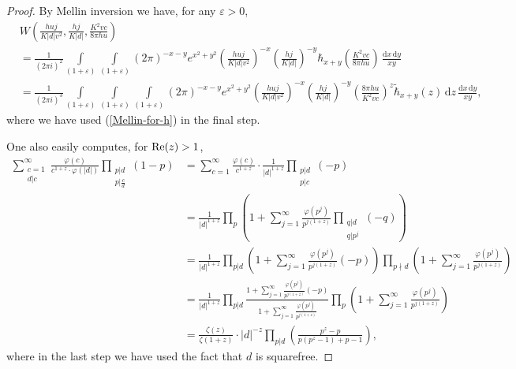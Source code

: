 \documentclass[a4paper,10pt,twoside]{amsart}
\theoremstyle{definition}
\numberwithin{equation}{section}
\newcommand\eps{\varepsilon}
\renewcommand{\Re}{\textnormal{Re}}
\renewcommand\:{\colon}
\begin{document}
\begin{proof}
By Mellin inversion we have, for any $\eps>0$,
\begin{align*}
&W\left(\frac{huj}{K|d|v^2},\frac {hj}{K|d|},\frac{K^2vc}{8\pi hu}\right)\\
&=\frac1{(2\pi i)^2}\int\limits_{(1+\eps)}\int\limits_{(1+\eps)}(2\pi)^{-x-y}e^{x^2+y^2}\left(\frac{huj}{K|d|v^2}\right)^{-x}\left(\frac {hj}{K|d|}\right)^{-y}\hbar_{x+y}\left(\frac{K^2vc}{8\pi hu}\right)\,\frac{\mathrm d x\,\mathrm d y}{xy}\\
&=\frac1{(2\pi i)^3}\int\limits_{(1+\eps)}\int\limits_{(1+\eps)}\int\limits_{(1+\varepsilon)}(2\pi)^{-x-y}e^{x^2+y^2}\left(\frac{huj}{K|d|v^2}\right)^{-x}\left(\frac {hj}{K|d|}\right)^{-y}\left(\frac{8\pi hu}{K^2vc}\right)^z\widetilde\hbar_{x+y}(z)\,\mathrm d z\,\frac{\mathrm d x\,\mathrm d y}{xy},
\end{align*}
where we have used (\ref{Mellin-for-h}) in the final step. 

One also easily computes, for $\Re(z)>1$,
\begin{align*}
\sum_{\substack{c=1\\
d|c}}^\infty \frac{\varphi(c)}{c^{1+z}\cdot\varphi(|d|)}\prod_{\substack{p|d\\
p|\frac cd}}(1-p)&=\sum_{c=1}^\infty\frac{\varphi(c)}{c^{1+z}}\cdot\frac1{|d|^{1+z}}\prod_{\substack{p|d\\
p|c}}(-p) \\
&=\frac1{|d|^{1+z}}\prod_p\left(1+\sum_{j=1}^\infty\frac{\varphi(p^j)}{p^{j(1+z)}}\prod_{\substack{q|d\\
q|p^j}}(-q)\right)\\
&=\frac1{|d|^{1+z}}\prod_{p|d}\left(1+\sum_{j=1}^\infty\frac{\varphi(p^j)}{p^{j(1+z)}}(-p)\right)\prod_{p\nmid d}\left(1+\sum_{j=1}^\infty\frac{\varphi(p^j)}{p^{j(1+z)}}\right)\\
&=\frac1{|d|^{1+z}}\prod_{p|d}\frac{1+\sum_{j=1}^\infty\frac{\varphi(p^j)}{p^{j(1+z)}}(-p)}{1+\sum_{j=1}^\infty\frac{\varphi(p^j)}{p^{j(1+z)}}}\prod_p\left(1+\sum_{j=1}^\infty\frac{\varphi(p^j)}{p^{j(1+z)}}\right)\\
&=\frac{\zeta(z)}{\zeta(1+z)}\cdot |d|^{-z}\prod_{p|d}\left(\frac{p^{z}-p}{p(p^{z}-1)+p-1}\right),
\end{align*}
where in the last step we have used the fact that $d$ is squarefree. 


\end{proof}
\end{document}
